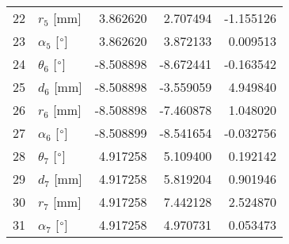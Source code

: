 \documentclass{standalone}%
\begin{document}
\begin{tabular}{llrrr}
22 &              $r_{5}$ [mm] &  3.862620 &   2.707494 &  -1.155126 \\
23 &  $\alpha_{5}$ [$\degree$] &  3.862620 &   3.872133 &   0.009513 \\
24 &  $\theta_{6}$ [$\degree$] & -8.508898 &  -8.672441 &  -0.163542 \\
25 &              $d_{6}$ [mm] & -8.508898 &  -3.559059 &   4.949840 \\
26 &              $r_{6}$ [mm] & -8.508898 &  -7.460878 &   1.048020 \\
27 &  $\alpha_{6}$ [$\degree$] & -8.508899 &  -8.541654 &  -0.032756 \\
28 &  $\theta_{7}$ [$\degree$] &  4.917258 &   5.109400 &   0.192142 \\
29 &              $d_{7}$ [mm] &  4.917258 &   5.819204 &   0.901946 \\
30 &              $r_{7}$ [mm] &  4.917258 &   7.442128 &   2.524870 \\
31 &  $\alpha_{7}$ [$\degree$] &  4.917258 &   4.970731 &   0.053473 \\
\bottomrule
\end{tabular}
%
\end{document}
